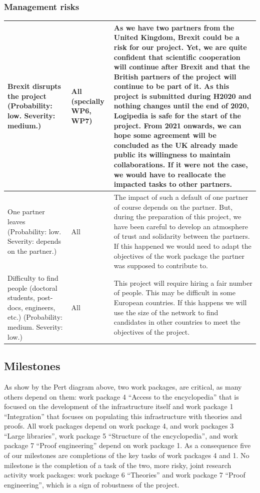 \subsubsection*{Management risks}

\begin{longtable*}{|p{0.30\textwidth}|p{0.10\textwidth}|p{0.50\textwidth}|}
\hline
Brexit disrupts the project (Probability: low. Severity: medium.)
&
All (specially WP6, WP7)
&
As we have two partners from the United Kingdom, Brexit could be a risk
for our project. Yet, we are quite confident
that scientific
cooperation will continue after Brexit and that the British partners
of the project will continue to be part of it.
As this project is submitted during H2020 and nothing changes until
the end of 2020, Logipedia is safe for the start of the project. From
2021 onwards, we can hope some agreement will be concluded as the UK
already made public its willingness to maintain collaborations.
If it were not the
case, we would have to reallocate the impacted tasks to other partners. 
\\
\hline
One partner leaves (Probability: low. Severity: depends on the partner.)
&
All
&
The impact of such a default of one partner of course depends on the
partner. But, during the preparation of this project, we have been
careful to develop an atmosphere of trust and solidarity between the
partners. If this happened
we would need to adapt the objectives of the work package the partner
was supposed to contribute to.
\\
\hline
Difficulty to find people (doctoral students, post-docs, engineers, etc.)
(Probability: medium. Severity: low.)
&
All
&
This project will require hiring a fair number of people. This may be
difficult in some European countries. If this happens we will use the
size of the network to find candidates in other countries to meet
the objectives of the project.\\
\hline
\end{longtable*}

\subsection*{Milestones}\label{sec:milestones}

As show by the Pert diagram above, two work packages, are critical, as
many others depend on them: work package 4 ``Access to the
encyclopedia'' that is focused on the development of the
infrastructure itself and work package 1 ``Integration'' that focuses
on populating this infrastructure with theories and proofs. All work
packages depend on work package 4, and work packages 3 ``Large
libraries'', work package 5 ``Structure of the encyclopedia'', and
work package 7 ``Proof engineering'' depend on work package 1.  As a
consequence five of our milestones are completions of the key tasks of
work packages 4 and 1.  No milestone is the completion of a task of
the two, more risky, joint research activity work packages: work
package 6 ``Theories'' and work package 7 ``Proof engineering'', which
is a sign of robustness of the project.
  

